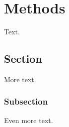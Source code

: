\chapter{Methods\label{cha:methods}}

Text.

\section{Section}

More text.

\subsection{Subsection}

Even more text.